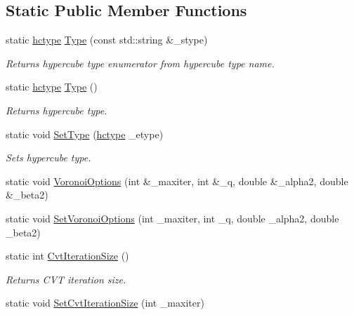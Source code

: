 \subsection*{Static Public Member Functions}
\begin{DoxyCompactItemize}
\item 
static \hyperlink{class_go_s_u_m_1_1_c_hypercube_a9113655515864c06ea6d4f08d5195c90}{hctype} \hyperlink{class_go_s_u_m_1_1_c_hypercube_a6d05fe2a4610d87af24ec6b39b8e1025}{Type} (const std\-::string \&\-\_\-stype)
\begin{DoxyCompactList}\small\item\em Returns hypercube type enumerator from hypercube type name. \end{DoxyCompactList}\item 
static \hyperlink{class_go_s_u_m_1_1_c_hypercube_a9113655515864c06ea6d4f08d5195c90}{hctype} \hyperlink{class_go_s_u_m_1_1_c_hypercube_abc5b419f9502e45cb89812a08d8a41cc}{Type} ()
\begin{DoxyCompactList}\small\item\em Returns hypercube type. \end{DoxyCompactList}\item 
static void \hyperlink{class_go_s_u_m_1_1_c_hypercube_a96309f61dce90f72da0b1ecc5c3d758b}{Set\-Type} (\hyperlink{class_go_s_u_m_1_1_c_hypercube_a9113655515864c06ea6d4f08d5195c90}{hctype} \-\_\-etype)
\begin{DoxyCompactList}\small\item\em Sets hypercube type. \end{DoxyCompactList}\item 
static void \hyperlink{class_go_s_u_m_1_1_c_hypercube_a1ba153b23eaf17f51cd0b3e85f2cc59d}{Voronoi\-Options} (int \&\-\_\-maxiter, int \&\-\_\-q, double \&\-\_\-alpha2, double \&\-\_\-beta2)
\item 
static void \hyperlink{class_go_s_u_m_1_1_c_hypercube_a1c4d81419562b324b8c3486f36ef2033}{Set\-Voronoi\-Options} (int \-\_\-maxiter, int \-\_\-q, double \-\_\-alpha2, double \-\_\-beta2)
\item 
static int \hyperlink{class_go_s_u_m_1_1_c_hypercube_a402c5b23d7bb6a209ad7c423b7469008}{Cvt\-Iteration\-Size} ()
\begin{DoxyCompactList}\small\item\em Returns C\-V\-T iteration size. \end{DoxyCompactList}\item 
static void \hyperlink{class_go_s_u_m_1_1_c_hypercube_a94f1eb472623fd241372562607e8d6a5}{Set\-Cvt\-Iteration\-Size} (int \-\_\-maxiter)

\end{DoxyCompactItemize}
